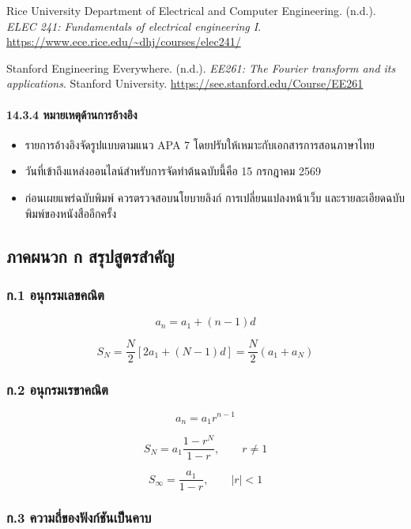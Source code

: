 Rice University Department of Electrical and Computer Engineering. (n.d.). \textit{ELEC 241: Fundamentals of electrical engineering I}. \url{https://www.ece.rice.edu/~dhj/courses/elec241/}

Stanford Engineering Everywhere. (n.d.). \textit{EE261: The Fourier transform and its applications}. Stanford University. \url{https://see.stanford.edu/Course/EE261}

\par
\endgroup

\paragraph{14.3.4 หมายเหตุด้านการอ้างอิง}

\begin{itemize}
\item
  รายการอ้างอิงจัดรูปแบบตามแนว APA 7 โดยปรับให้เหมาะกับเอกสารการสอนภาษาไทย
\item
  วันที่เข้าถึงแหล่งออนไลน์สำหรับการจัดทำต้นฉบับนี้คือ 15 กรกฎาคม 2569
\item
  ก่อนเผยแพร่ฉบับพิมพ์ ควรตรวจสอบนโยบายลิงก์ การเปลี่ยนแปลงหน้าเว็บ และรายละเอียดฉบับพิมพ์ของหนังสืออีกครั้ง
\end{itemize}


\subsection{ภาคผนวก ก สรุปสูตรสำคัญ}

\subsubsection{ก.1 อนุกรมเลขคณิต}

\[
a_n=a_1+(n-1)d
\]

\[
S_N=\frac{N}{2}[2a_1+(N-1)d]=\frac{N}{2}(a_1+a_N)
\]

\subsubsection{ก.2 อนุกรมเรขาคณิต}

\[
a_n=a_1r^{n-1}
\]

\[
S_N=a_1\frac{1-r^N}{1-r},\qquad r\ne1
\]

\[
S_\infty=\frac{a_1}{1-r},\qquad |r|<1
\]

\subsubsection{ก.3 ความถี่ของฟังก์ชันเป็นคาบ}

